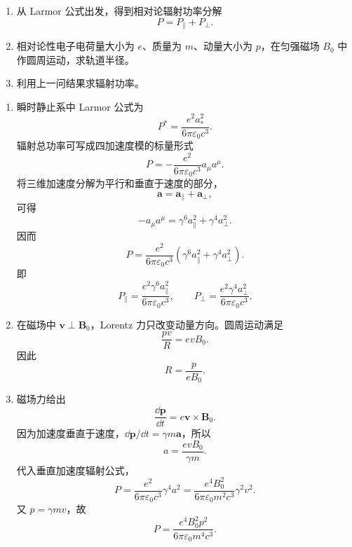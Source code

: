 \begin{question}[相对论辐射功率分解与磁场中圆周运动]
\begin{enumerate}
  \item 从 Larmor 公式出发，得到相对论辐射功率分解
  \[
    P=P_\parallel+P_\perp .
  \]
  \item 相对论性电子电荷量大小为 $e$、质量为 $m$、动量大小为 $p$，在匀强磁场 $B_0$ 中作圆周运动，求轨道半径。
  \item 利用上一问结果求辐射功率。
\end{enumerate}
\begin{solution}
\begin{enumerate}
  \item 瞬时静止系中 Larmor 公式为
  \[
    P^*=\frac{e^2a_*^2}{6\pi\varepsilon_0c^3} .
  \]
  辐射总功率可写成四加速度模的标量形式
  \[
    P=-\frac{e^2}{6\pi\varepsilon_0c^3}a_\mu a^\mu .
  \]
  将三维加速度分解为平行和垂直于速度的部分，
  \[
    \mathbf a=\mathbf a_\parallel+\mathbf a_\perp,
  \]
  可得
  \[
    -a_\mu a^\mu=\gamma^6a_\parallel^2+\gamma^4a_\perp^2 .
  \]
  因而
  \[
    \boxed{P=\frac{e^2}{6\pi\varepsilon_0c^3}
    \left(\gamma^6a_\parallel^2+\gamma^4a_\perp^2\right)} .
  \]
  即
  \[
    P_\parallel=\frac{e^2\gamma^6a_\parallel^2}{6\pi\varepsilon_0c^3},
    \qquad
    P_\perp=\frac{e^2\gamma^4a_\perp^2}{6\pi\varepsilon_0c^3} .
  \]

  \item 在磁场中 $\mathbf v\perp\mathbf B_0$，Lorentz 力只改变动量方向。圆周运动满足
  \[
    \frac{pv}{R}=evB_0 .
  \]
  因此
  \[
    \boxed{R=\frac{p}{eB_0}} .
  \]

  \item 磁场力给出
  \[
    \frac{\dd{\mathbf p}}{\dd{t}}=e\mathbf v\times\mathbf B_0 .
  \]
  因为加速度垂直于速度，$\dd{\mathbf p}/\dd{t}=\gamma m\mathbf a$，所以
  \[
    a=\frac{evB_0}{\gamma m} .
  \]
  代入垂直加速度辐射公式，
  \[
    P=\frac{e^2}{6\pi\varepsilon_0c^3}\gamma^4a^2
    =\frac{e^4B_0^2}{6\pi\varepsilon_0m^2c^3}\gamma^2v^2 .
  \]
  又 $p=\gamma mv$，故
  \[
    \boxed{P=\frac{e^4B_0^2p^2}{6\pi\varepsilon_0m^4c^3}} .
  \]
\end{enumerate}
\end{solution}
\end{question}

